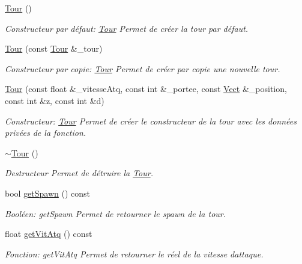 \begin{DoxyCompactItemize}
\item 
\hyperlink{classTour_a85e0f0e2346d1e42a09a80c1cd6d19c4}{Tour} ()
\begin{DoxyCompactList}\small\item\em Constructeur par défaut\+: \hyperlink{classTour}{Tour} Permet de créer la tour par défaut. \end{DoxyCompactList}\item 
\hyperlink{classTour_a3e25a64c74446192ac71283e08db4e49}{Tour} (const \hyperlink{classTour}{Tour} \&\+\_\+tour)
\begin{DoxyCompactList}\small\item\em Constructeur par copie\+: \hyperlink{classTour}{Tour} Permet de créer par copie une nouvelle tour. \end{DoxyCompactList}\item 
\hyperlink{classTour_abb21d80605aacb220f1ab7ac92119ce4}{Tour} (const float \&\+\_\+vitesse\+Atq, const int \&\+\_\+portee, const \hyperlink{classVect}{Vect} \&\+\_\+position, const int \&z, const int \&d)
\begin{DoxyCompactList}\small\item\em Constructeur\+: \hyperlink{classTour}{Tour} Permet de créer le constructeur de la tour avec les données privées de la fonction. \end{DoxyCompactList}\item 
\mbox{\label{classTour_a6d692d4b1a687bf34f6b38828d86512e}} 
\hyperlink{classTour_a6d692d4b1a687bf34f6b38828d86512e}{$\sim$\+Tour} ()
\begin{DoxyCompactList}\small\item\em Destructeur Permet de détruire la \hyperlink{classTour}{Tour}. \end{DoxyCompactList}\item 
bool \hyperlink{classTour_ac37676f670ba4235601de5c3c4ff791c}{get\+Spawn} () const
\begin{DoxyCompactList}\small\item\em Booléen\+: get\+Spawn Permet de retourner le spawn de la tour. \end{DoxyCompactList}\item 
float \hyperlink{classTour_aa5bfbcd4783a1917adc670ff92283771}{get\+Vit\+Atq} () const
\begin{DoxyCompactList}\small\item\em Fonction\+: get\+Vit\+Atq Permet de retourner le réel de la vitesse d\textquotesingle{}attaque. \end{DoxyCompactList}\item 

\end{DoxyCompactItemize}
